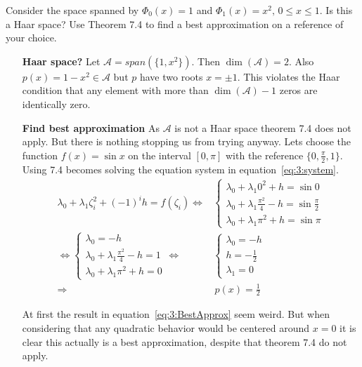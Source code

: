 \begin{problem}
  Consider the space spanned by $\Phi_0(x) = 1$ and
  $\Phi_1(x) = x^2 ,\, 0 \leq x ≤ 1$. Is this a Haar space? Use
  Theorem 7.4 to find a best approximation on a reference of your
  choice.
\end{problem}


 \begin{solution}
   \begin{enumerate}
     \item[\bf Haar space?] Let $\mathcal{A} = span(\{1, x^2\})$. Then
       $\dim(\mathcal{A}) = 2$. Also $ p(x) = 1 - x^2 \in \mathcal{A}$
       but $p$ have two roots $x = \pm 1$. This violates the Haar
      condition that any element with more than $\dim(\mathcal{A}) -
      1$ zeros are identically zero.
    \item[\bf Find best approximation] As $\mathcal{A}$ is not a Haar
      space theorem 7.4 does not apply. But there is nothing stopping
      us from trying anyway. Lets choose the function $f(x) = \sin x$
      on the interval $[0, \pi]$ with the reference
      $\{0, \frac{\pi}{2}, 1 \}$. Using 7.4 becomes solving the
      equation system in equation~\ref{eq:3:system}.
       \begin{align}
         \label{eq:3:system}
         \lambda_0 + \lambda_1 \zeta_{i}^{2} + {(-1)}^{i}h = f(\zeta_i) 
         \Leftrightarrow &
        \begin{cases} 
          \lambda_0 + \lambda_1 0^2 + h = \sin 0 \\
          \lambda_0 + \lambda_1 {\frac{\pi^2}{4}} - h =
          \sin \frac{\pi}{2} \\
          \lambda_0 + \lambda_1 {\pi}^2 + h = \sin \pi
        \end{cases} \\
         \Leftrightarrow \nonumber
        \begin{cases}
          \lambda_0 = -h \\
          \lambda_0 + \lambda_1 \frac{\pi^2}{4} - h = 1 \\
          \lambda_0 + \lambda_1 {\pi}^2 + h = 0
        \end{cases} 
        \Leftrightarrow & 
        \begin{cases}
          \lambda_0 = -h \\
          h = -\frac{1}{2} \\
          \lambda_1  = 0
        \end{cases} \\
        \Rightarrow & \, 
        p(x) = \frac{1}{2} \label{eq:3:BestApprox}
       \end{align}

       At first the result in equation~\ref{eq:3:BestApprox} seem
       weird. But when considering that any quadratic behavior would
       be centered around $x=0$ it is clear this actually is a best
       approximation, despite that theorem 7.4 do not apply.
      
     \end{enumerate}
    
   \end{solution}

